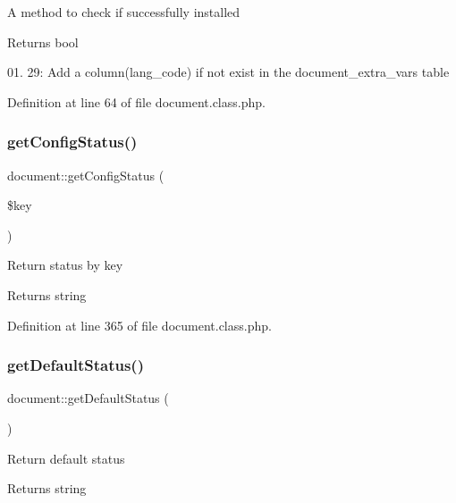 A method to check if successfully installed \begin{DoxyReturn}{Returns}
bool 
\end{DoxyReturn}

\begin{DoxyEnumerate}
\item 01. 29\+: Add a column(lang\+\_\+code) if not exist in the document\+\_\+extra\+\_\+vars table
\end{DoxyEnumerate}

Definition at line 64 of file document.\+class.\+php.

\mbox{\label{classdocument_a319eeb35de3ffef5cb32374283b7bf14}} 
\subsubsection{\texorpdfstring{get\+Config\+Status()}{getConfigStatus()}}
{\footnotesize\ttfamily document\+::get\+Config\+Status (\begin{DoxyParamCaption}\item[{}]{\$key }\end{DoxyParamCaption})}

Return status by key \begin{DoxyReturn}{Returns}
string 
\end{DoxyReturn}


Definition at line 365 of file document.\+class.\+php.

\mbox{\label{classdocument_aacc6b168cae9bf79d7a13d6f5bb4fdfb}} 
\subsubsection{\texorpdfstring{get\+Default\+Status()}{getDefaultStatus()}}
{\footnotesize\ttfamily document\+::get\+Default\+Status (\begin{DoxyParamCaption}{ }\end{DoxyParamCaption})}

Return default status \begin{DoxyReturn}{Returns}
string 
\end{DoxyReturn}


